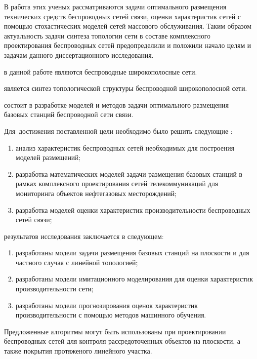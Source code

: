 В работа этих ученых рассматриваются задачи оптимального размещения технических средств беспроводных сетей связи, оценки характеристик сетей с помощью стохастических моделей сетей массового обслуживания. Таким образом актуальность задачи синтеза топологии сети в составе комплексного проектирования беспроводных сетей предопределили и положили начало целям и задачам данного диссертационного исследования. 


{\objectresearch} в данной работе являются беспроводные широкополосные сети.

{\subjectresearch} является синтез топологической структуры беспроводной широкополосной сети.


{\aim} состоит в разработке моделей и методов задачи оптимального размещения базовых станций беспроводной сети связи.

Для~достижения поставленной цели необходимо было решить следующие {\tasks}:
\begin{enumerate}[beginpenalty=10000] %
  \item анализ характеристик беспроводных сетей необходимых для построения моделей размещений;
  \item разработка математических моделей задачи размещения базовых станций в рамках комплексного проектирования сетей телекоммуникаций для мониторинга объектов нефтегазовых месторождений;
  \item разработка моделей оценки характеристик производительности беспроводных сетей связи;
\end{enumerate}


{\novelty} результатов исследования заключается в следующем:
\begin{enumerate}[beginpenalty=10000] %
  \item разработаны модели задачи размещения базовых станций на плоскости и для частного случая с линейной топологией;
  \item разработаны модели имитационного моделирования для оценки характеристик производительности сети;
  \item разработаны модели прогнозирования оценок характеристик производительности с помощью методов машинного обучения.
\end{enumerate}

{\influence} Предложенные алгоритмы могут быть использованы при проектировании беспроводных сетей для контроля рассредоточенных объектов на плоскости, а также покрытия протяженого линейного участка.

